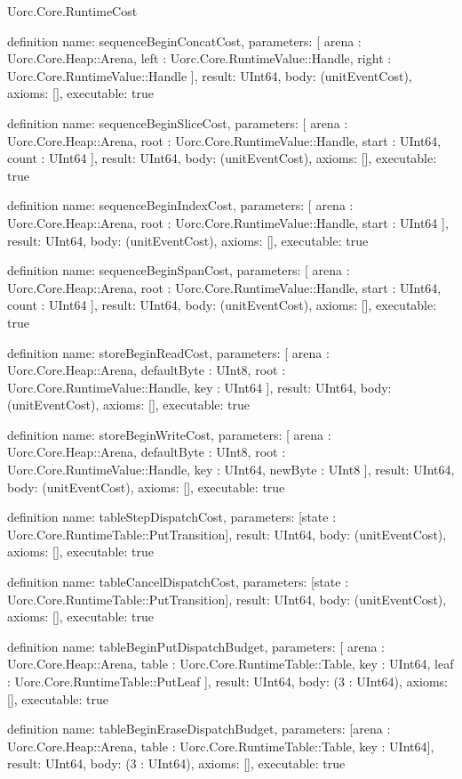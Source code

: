 \begin{lexlean}{Uorc.Core.RuntimeCost}
\begin{semanticmodule}
definition{
  name: sequenceBeginConcatCost,
  parameters: [
    arena : Uorc.Core.Heap::Arena,
    left : Uorc.Core.RuntimeValue::Handle,
    right : Uorc.Core.RuntimeValue::Handle
  ],
  result: UInt64,
  body: (unitEventCost),
  axioms: [],
  executable: true
}

definition{
  name: sequenceBeginSliceCost,
  parameters: [
    arena : Uorc.Core.Heap::Arena,
    root : Uorc.Core.RuntimeValue::Handle,
    start : UInt64,
    count : UInt64
  ],
  result: UInt64,
  body: (unitEventCost),
  axioms: [],
  executable: true
}

definition{
  name: sequenceBeginIndexCost,
  parameters: [
    arena : Uorc.Core.Heap::Arena,
    root : Uorc.Core.RuntimeValue::Handle,
    start : UInt64
  ],
  result: UInt64,
  body: (unitEventCost),
  axioms: [],
  executable: true
}

definition{
  name: sequenceBeginSpanCost,
  parameters: [
    arena : Uorc.Core.Heap::Arena,
    root : Uorc.Core.RuntimeValue::Handle,
    start : UInt64,
    count : UInt64
  ],
  result: UInt64,
  body: (unitEventCost),
  axioms: [],
  executable: true
}

definition{
  name: storeBeginReadCost,
  parameters: [
    arena : Uorc.Core.Heap::Arena,
    defaultByte : UInt8,
    root : Uorc.Core.RuntimeValue::Handle,
    key : UInt64
  ],
  result: UInt64,
  body: (unitEventCost),
  axioms: [],
  executable: true
}

definition{
  name: storeBeginWriteCost,
  parameters: [
    arena : Uorc.Core.Heap::Arena,
    defaultByte : UInt8,
    root : Uorc.Core.RuntimeValue::Handle,
    key : UInt64,
    newByte : UInt8
  ],
  result: UInt64,
  body: (unitEventCost),
  axioms: [],
  executable: true
}

definition{
  name: tableStepDispatchCost,
  parameters: [state : Uorc.Core.RuntimeTable::PutTransition],
  result: UInt64,
  body: (unitEventCost),
  axioms: [],
  executable: true
}

definition{
  name: tableCancelDispatchCost,
  parameters: [state : Uorc.Core.RuntimeTable::PutTransition],
  result: UInt64,
  body: (unitEventCost),
  axioms: [],
  executable: true
}

definition{
  name: tableBeginPutDispatchBudget,
  parameters: [
    arena : Uorc.Core.Heap::Arena,
    table : Uorc.Core.RuntimeTable::Table,
    key : UInt64,
    leaf : Uorc.Core.RuntimeTable::PutLeaf
  ],
  result: UInt64,
  body: (3 : UInt64),
  axioms: [],
  executable: true
}

definition{
  name: tableBeginEraseDispatchBudget,
  parameters: [arena : Uorc.Core.Heap::Arena, table : Uorc.Core.RuntimeTable::Table, key : UInt64],
  result: UInt64,
  body: (3 : UInt64),
  axioms: [],
  executable: true
}


\end{semanticmodule}
\end{lexlean}

